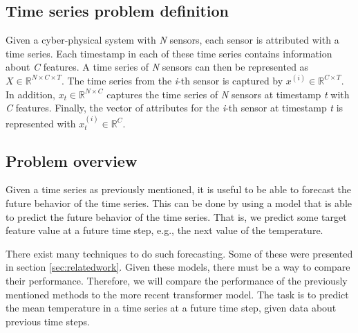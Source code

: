 \subsection{Time series problem definition}
Given a cyber-physical system with \textit{N} sensors, each sensor is attributed with a time series.
Each timestamp in each of these time series contains information about \textit{C} features.
A time series of \textit{N} sensors can then be represented as \(X \in \mathbb{R}^{N \times C \times T}\).
The time series from the \textit{i}-th sensor is captured by \(x^{(i)} \in \mathbb{R}^{C \times T} \).
In addition, \(x_{t} \in \mathbb{R}^{N \times C}\) captures the time series of \textit{N} sensors at timestamp \textit{t} with \textit{C} features.
Finally, the vector of attributes for the \textit{i}-th sensor at timestamp \textit{t} is represented with \(x_{t}^{(i)} \in \mathbb{R}^{C}\). \cite{cirsteaEnhanceNetPluginNeural2021}


\subsection{Problem overview}
Given a time series as previously mentioned, it is useful to be able to forecast the future behavior of the time series.
This can be done by using a model that is able to predict the future behavior of the time series.
That is, we predict some target feature value at a future time step, e.g., the next value of the temperature.


There exist many techniques to do such forecasting. Some of these were presented in section \ref{sec:relatedwork}.
Given these models, there must be a way to compare their performance.
Therefore, we will compare the performance of the previously mentioned methods to the more recent transformer model.
The task is to predict the mean temperature in a time series at a future time step, given data about previous time steps.